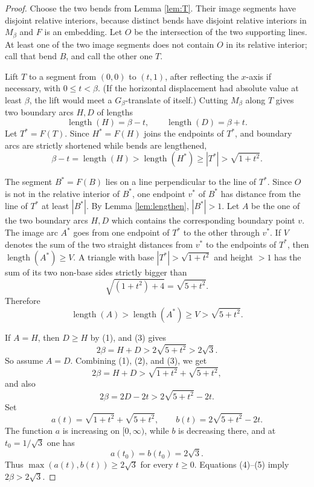 \documentclass[12pt]{article}
\newcommand{\ellg}{\operatorname{length}}
\begin{document}
\begin{proof}
Choose the two bends from Lemma \ref{lem:T}.  Their image segments have
disjoint relative interiors, because distinct bends have disjoint
relative interiors in \(M_\beta\) and \(F\) is an embedding.  Let \(O\) be
the intersection of the two supporting lines.  At least one of the two
image segments does not contain \(O\) in its relative interior; call that
bend \(B\), and call the other one \(T\).

Lift \(T\) to a segment from \((0,0)\) to \((t,1)\), after reflecting the
\(x\)-axis if necessary, with \(0\le t<\beta\).  (If the horizontal
displacement had absolute value at least \(\beta\), the lift would meet a
\(G_\beta\)-translate of itself.)  Cutting \(M_\beta\) along
\(T\) gives two boundary arcs \(H,D\) of lengths
\[
        \ellg(H)=\beta-t,\qquad \ellg(D)=\beta+t.        \tag{1}
\]
Let \(T^*=F(T)\).  Since \(H^*=F(H)\) joins the endpoints of \(T^*\), and
boundary arcs are strictly shortened while bends are lengthened,
\[
        \beta-t=\ellg(H)>\ellg(H^*)\ge |T^*|>\sqrt{1+t^2}.       \tag{2}
\]

The segment \(B^*=F(B)\) lies on a line perpendicular to the line of
\(T^*\).  Since \(O\) is not in the relative interior of \(B^*\), one
endpoint \(v^*\) of \(B^*\) has distance from the line of \(T^*\) at least
\(|B^*|\).  By Lemma \ref{lem:lengthen}, \(|B^*|>1\).  Let \(A\) be the
one of the two boundary arcs \(H,D\) which contains the corresponding
boundary point \(v\).  The image arc \(A^*\) goes from one endpoint of
\(T^*\) to the other through \(v^*\).  If \(V\) denotes the sum of the two
straight distances from \(v^*\) to the endpoints of \(T^*\), then
\(\ellg(A^*)\ge V\).  A triangle with base \(|T^*|>\sqrt{1+t^2}\) and
height \(>1\) has the sum of its two non-base sides strictly bigger than
\[
        \sqrt{(1+t^2)+4}=\sqrt{5+t^2}.
\]
Therefore
\[
        \ellg(A)>\ellg(A^*)\ge V>\sqrt{5+t^2}.                  \tag{3}
\]

If \(A=H\), then \(D\ge H\) by (1), and (3) gives
\[
        2\beta=H+D>2\sqrt{5+t^2}>2\sqrt3.
\]
So assume \(A=D\).  Combining (1), (2), and (3), we get
\[
 2\beta=H+D>\sqrt{1+t^2}+\sqrt{5+t^2},                         \tag{4}
\]
and also
\[
 2\beta=2D-2t>2\sqrt{5+t^2}-2t.                                \tag{5}
\]
Set
\[
 a(t)=\sqrt{1+t^2}+\sqrt{5+t^2},\qquad
 b(t)=2\sqrt{5+t^2}-2t.
\]
The function \(a\) is increasing on \([0,\infty)\), while \(b\) is
decreasing there, and at \(t_0=1/\sqrt3\) one has
\[
        a(t_0)=b(t_0)=2\sqrt3 .
\]
Thus \(\max(a(t),b(t))\ge2\sqrt3\) for every \(t\ge0\).  Equations
(4)--(5) imply \(2\beta>2\sqrt3\).
\end{proof}
\end{document}
